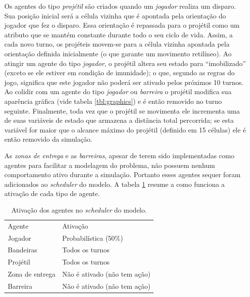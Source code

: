 \documentclass[preprint,12pt]{elsarticle}
\begin{document}
Os agentes do tipo \textit{projétil} são criados quando um \textit{jogador} realiza um disparo. Sua posição inicial será a célula vizinha que é apontada pela orientação do jogador que fez o disparo. Essa orientação é repassada para o projétil como um atributo que se mantém constante durante todo o seu ciclo de vida. Assim, a cada novo turno, os projéteis movem-se para a célula vizinha apontada pela orientação definida inicialmente (o que garante um movimento retilíneo). Ao atingir um agente do tipo \textit{jogador}, o projétil altera seu estado para ``imobilizado'' (exceto se ele estiver em condição de imunidade); o que, segundo as regras do jogo, significa que este jogador não poderá ser ativado pelos próximos 10 turnos. Ao colidir com um agente do tipo \textit{jogador} ou \textit{barreira} o projétil modifica sua aparência gráfica (vide tabela \ref{tbl:graphics}) e é então removido no turno seguinte. Finalmente, toda vez que o projétil se movimenta ele incrementa uma de suas variáveis de estado que armazena a distância total percorrida; se esta variável for maior que o alcance máximo do projétil (definido em 15 células) ele é então removido da simulação.

As \textit{zonas de entrega} e as \textit{barreiras}, apesar de terem sido implementadas como agentes para facilitar a modelagem do problema, não possuem nenhum comportamento ativo durante a simulação. Portanto esses agentes sequer foram adicionados ao \textit{scheduler} do modelo. A tabela \ref{tbl:ativacao} resume a como funciona a ativação de cada tipo de agente.

\begin{table}[h!]
	\begin{center}
		\begin{tabular}{ll}
			\toprule
			Agente & Ativação \\ 
			\cmidrule(r){1-1}\cmidrule(lr){2-2}
			Jogador   & Probabilística (50\%) \\
			Bandeiras & Todos os turnos       \\
			Projétil  & Todos os turnos		  \\
			Zona de entrega & Não é ativado (não tem ação) \\
			Barreira        & Não é ativado (não tem ação)\\
			\bottomrule
		\end{tabular}
		\caption{Ativação dos agentes no \textit{scheduler} do modelo.}
		\label{tbl:ativacao}
	\end{center}
\end{table}
\end{document}
